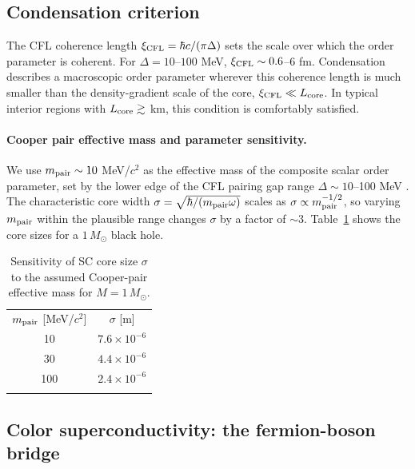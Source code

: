 \documentclass[epj]{svjour}
\begin{document}
\subsection{Condensation criterion}
\label{sec:condensation_criterion}

The CFL coherence length $\xi_{\rm CFL} = \hbar c/(\pi\Delta)$ sets the scale over which the order parameter is coherent. For $\Delta = 10$--$100$ MeV, $\xi_{\rm CFL} \sim 0.6$--$6$ fm. Condensation describes a macroscopic order parameter wherever this coherence length is much smaller than the density-gradient scale of the core, $\xi_{\rm CFL} \ll L_{\rm core}$. In typical interior regions with $L_{\rm core} \gtrsim$ km, this condition is comfortably satisfied.

\paragraph{Cooper pair effective mass and parameter sensitivity.}
We use $m_{\rm pair} \sim 10$ MeV/$c^2$ as the effective mass of the composite scalar order parameter, set by the lower edge of the CFL pairing gap range $\Delta \sim 10$--100 MeV \cite{Alford2008}. The characteristic core width $\sigma = \sqrt{\hbar/(m_{\rm pair}\omega)}$ scales as $\sigma \propto m_{\rm pair}^{-1/2}$, so varying $m_{\rm pair}$ within the plausible range changes $\sigma$ by a factor of $\sim 3$. Table~\ref{tab:sensitivity} shows the core sizes for a $1\,M_\odot$ black hole.

\begin{table}
\centering
\caption{Sensitivity of SC core size $\sigma$ to the assumed Cooper-pair effective mass for $M = 1\,M_\odot$.}
\label{tab:sensitivity}
\begin{tabular}{cc}
\hline\noalign{\smallskip}
$m_{\rm pair}$ [MeV/$c^2$] & $\sigma$ [m] \\
\noalign{\smallskip}\hline\noalign{\smallskip}
10  & $7.6 \times 10^{-6}$ \\
30  & $4.4 \times 10^{-6}$ \\
100 & $2.4 \times 10^{-6}$ \\
\noalign{\smallskip}\hline
\end{tabular}
\end{table}

\subsection{Color superconductivity: the fermion-boson bridge}
\label{sec:CFL_bridge}
\end{document}
